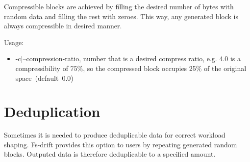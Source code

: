 \documentclass[
  color, %
  table, %
  lof,   %
  lot,   %
]{fithesis3}
\begin{document}
Compressible blocks are achieved by filling the desired number of bytes with random data and filling the rest with zeroes. This way, any generated block is always compressible in desired manner.



Usage:
\begin{itemize}
    \item -c|--compression-ratio, number that is a desired compress ratio, e.g. 4.0 is a compressibility of 75\%, so the compressed block occupies 25\% of the original space~(default~0.0)
\end{itemize}


\section{Deduplication}
Sometimes it is needed to produce deduplicable data for correct workload shaping. Fs-drift provides this option to users by repeating generated random blocks. Outputed data is therefore deduplicable to a specified amount.


\end{document}

